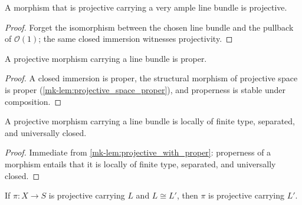 \begin{lemma}
  \label{mk-lem:projective_with_forget}
  \leanok
  A morphism that is projective carrying a very ample line bundle is
  projective.
\end{lemma}

\begin{proof}
  \leanok
  Forget the isomorphism between the chosen line bundle and the pullback of
  \(\mathcal{O}(1)\); the same closed immersion witnesses projectivity.
\end{proof}

\begin{lemma}
  \label{mk-lem:projective_with_proper}
  \leanok
  A projective morphism carrying a line bundle is proper.
\end{lemma}

\begin{proof}
  \leanok
  A closed immersion is proper, the structural morphism of projective space
  is proper (\ref{mk-lem:projective_space_proper}), and properness is stable
  under composition.
\end{proof}

\begin{lemma}
  \label{mk-lem:projective_with_structural}
  \leanok
  A projective morphism carrying a line bundle is locally of finite type,
  separated, and universally closed.
\end{lemma}

\begin{proof}
  \leanok
  Immediate from \ref{mk-lem:projective_with_proper}: properness of a morphism
  entails that it is locally of finite type, separated, and universally
  closed.
\end{proof}

\begin{lemma}
  \label{mk-lem:projective_with_iso}
  \leanok
  If \(\pi : X \to S\) is projective carrying \(L\) and \(L \cong L'\), then
  \(\pi\) is projective carrying \(L'\).
\end{lemma}

